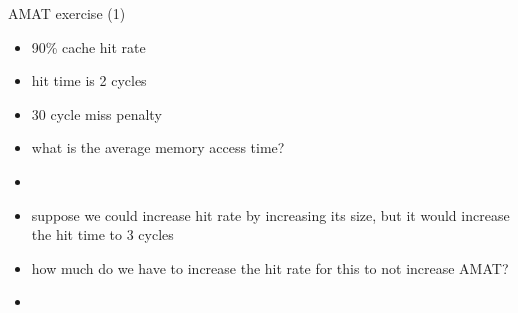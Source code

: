 \begin{frame}{AMAT exercise (1)}
\begin{itemize}
\item 90\% cache hit rate
\item hit time is 2 cycles
\item 30 cycle miss penalty
\item what is the average memory access time?
\item<2-> \iftoggle{heldback}{}{5 cycles}
\vspace{.5cm}
\item suppose we could increase hit rate by increasing its size, but it would increase the hit time to 3 cycles
\item how much do we have to increase the hit rate for this to not increase AMAT?
\item<3-> \iftoggle{heldback}{}{to miss rate of 2/30 $\rightarrow$ to approx 93\% hit rate}
\end{itemize}
\end{frame}
